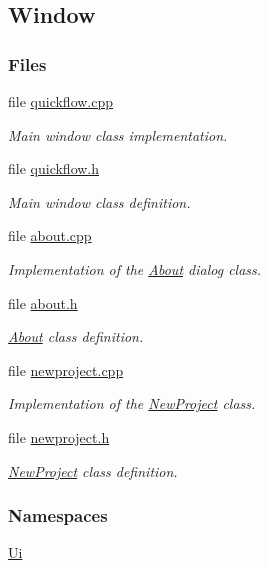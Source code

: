 \hypertarget{group___window}{}\subsection{Window}
\label{group___window}
\subsubsection*{Files}
\begin{DoxyCompactItemize}
\item 
file \hyperlink{quickflow_8cpp}{quickflow.\+cpp}
\begin{DoxyCompactList}\small\item\em Main window class implementation. \end{DoxyCompactList}\item 
file \hyperlink{quickflow_8h}{quickflow.\+h}
\begin{DoxyCompactList}\small\item\em Main window class definition. \end{DoxyCompactList}\item 
file \hyperlink{about_8cpp}{about.\+cpp}
\begin{DoxyCompactList}\small\item\em Implementation of the \hyperlink{class_about}{About} dialog class. \end{DoxyCompactList}\item 
file \hyperlink{about_8h}{about.\+h}
\begin{DoxyCompactList}\small\item\em \hyperlink{class_about}{About} class definition. \end{DoxyCompactList}\item 
file \hyperlink{newproject_8cpp}{newproject.\+cpp}
\begin{DoxyCompactList}\small\item\em Implementation of the \hyperlink{class_new_project}{New\+Project} class. \end{DoxyCompactList}\item 
file \hyperlink{newproject_8h}{newproject.\+h}
\begin{DoxyCompactList}\small\item\em \hyperlink{class_new_project}{New\+Project} class definition. \end{DoxyCompactList}\end{DoxyCompactItemize}
\subsubsection*{Namespaces}
\begin{DoxyCompactItemize}
\item 
 \hyperlink{namespace_ui}{Ui}
\end{DoxyCompactItemize}
